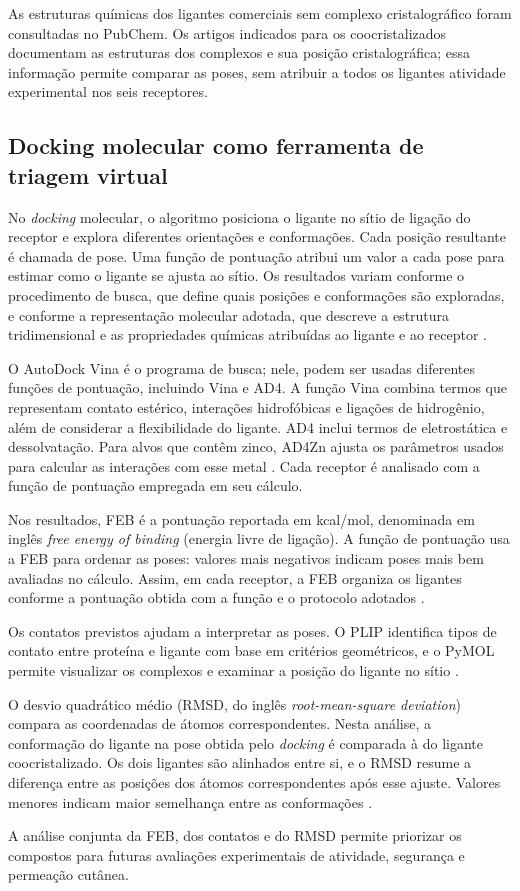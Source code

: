 As estruturas químicas dos ligantes comerciais sem complexo cristalográfico foram consultadas no PubChem. Os artigos indicados para os coocristalizados documentam as estruturas dos complexos e sua posição cristalográfica; essa informação permite comparar as poses, sem atribuir a todos os ligantes atividade experimental nos seis receptores.

\subsection{Docking molecular como ferramenta de triagem virtual}
No \textit{docking} molecular, o algoritmo posiciona o ligante no sítio de ligação do receptor e explora diferentes orientações e conformações. Cada posição resultante é chamada de pose. Uma função de pontuação atribui um valor a cada pose para estimar como o ligante se ajusta ao sítio. Os resultados variam conforme o procedimento de busca, que define quais posições e conformações são exploradas, e conforme a representação molecular adotada, que descreve a estrutura tridimensional e as propriedades químicas atribuídas ao ligante e ao receptor \parencite{eberhardt2021vina,trott2010}.

O AutoDock Vina é o programa de busca; nele, podem ser usadas diferentes funções de pontuação, incluindo Vina e AD4. A função Vina combina termos que representam contato estérico, interações hidrofóbicas e ligações de hidrogênio, além de considerar a flexibilidade do ligante. AD4 inclui termos de eletrostática e dessolvatação. Para alvos que contêm zinco, AD4Zn ajusta os parâmetros usados para calcular as interações com esse metal \parencite{eberhardt2021vina,morris2009autodock,santos2014zn,trott2010}. Cada receptor é analisado com a função de pontuação empregada em seu cálculo.

Nos resultados, FEB é a pontuação reportada em kcal/mol, denominada em inglês \textit{free energy of binding} (energia livre de ligação). A função de pontuação usa a FEB para ordenar as poses: valores mais negativos indicam poses mais bem avaliadas no cálculo. Assim, em cada receptor, a FEB organiza os ligantes conforme a pontuação obtida com a função e o protocolo adotados \parencite{warren2006}.

Os contatos previstos ajudam a interpretar as poses. O PLIP identifica tipos de contato entre proteína e ligante com base em critérios geométricos, e o PyMOL permite visualizar os complexos e examinar a posição do ligante no sítio \parencite{salentin2015plip,pymol}.

O desvio quadrático médio (RMSD, do inglês \textit{root-mean-square deviation}) compara as coordenadas de átomos correspondentes. Nesta análise, a conformação do ligante na pose obtida pelo \textit{docking} é comparada à do ligante coocristalizado. Os dois ligantes são alinhados entre si, e o RMSD resume a diferença entre as posições dos átomos correspondentes após esse ajuste. Valores menores indicam maior semelhança entre as conformações \parencite{cole2005}.

A análise conjunta da FEB, dos contatos e do RMSD permite priorizar os compostos para futuras avaliações experimentais de atividade, segurança e permeação cutânea.
